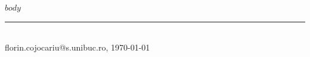 \documentclass[12pt,a4paper]{article}
\begin{document}
\pagestyle{plain}

$body$

\vfill
\noindent\rule{\textwidth}{0.4pt}\\[2pt]
{\tiny florin.cojocariu@s.unibuc.ro, \today}
\end{document}
